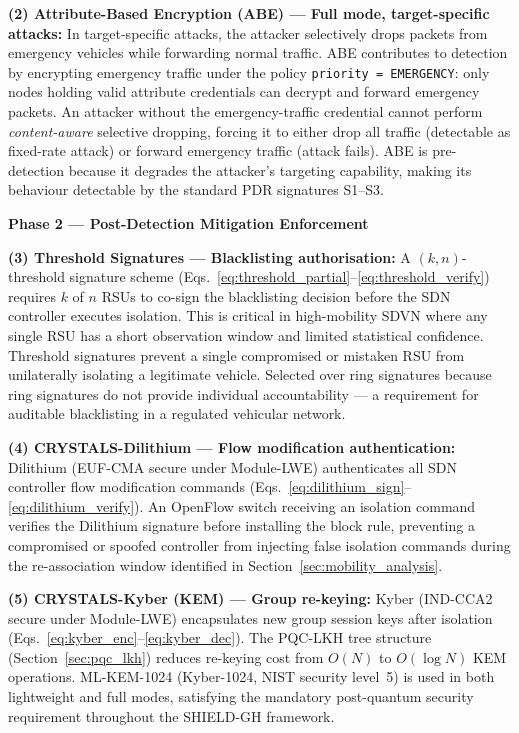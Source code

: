 \documentclass[12pt, a4paper]{report}
\newcommand{\mypar}{\vspace{0.8em}\noindent}
\begin{document}
\textbf{(2) Attribute-Based Encryption (ABE) --- Full mode, target-specific attacks:}
In target-specific attacks, the attacker selectively drops packets from emergency
vehicles while forwarding normal traffic. ABE contributes to detection by
encrypting emergency traffic under the policy \texttt{priority = EMERGENCY}: only
nodes holding valid attribute credentials can decrypt and forward emergency packets.
An attacker without the emergency-traffic credential cannot perform
\emph{content-aware} selective dropping, forcing it to either drop all traffic
(detectable as fixed-rate attack) or forward emergency traffic (attack fails).
ABE is pre-detection because it degrades the attacker's targeting capability,
making its behaviour detectable by the standard PDR signatures S1--S3.

\mypar
\textbf{Phase 2 --- Post-Detection Mitigation Enforcement}

\textbf{(3) Threshold Signatures --- Blacklisting authorisation:}
A $(k,n)$-threshold signature scheme (Eqs.~\eqref{eq:threshold_partial}--\eqref{eq:threshold_verify})
requires $k$ of $n$ RSUs to co-sign the blacklisting decision before the SDN
controller executes isolation. This is critical in high-mobility SDVN where any
single RSU has a short observation window and limited statistical confidence.
Threshold signatures prevent a single compromised or mistaken RSU from unilaterally
isolating a legitimate vehicle. Selected over ring signatures because ring
signatures do not provide individual accountability --- a requirement for auditable
blacklisting in a regulated vehicular network.

\textbf{(4) CRYSTALS-Dilithium --- Flow modification authentication:}
Dilithium (EUF-CMA secure under Module-LWE) authenticates all SDN controller flow
modification commands (Eqs.~\eqref{eq:dilithium_sign}--\eqref{eq:dilithium_verify}).
An OpenFlow switch receiving an isolation command verifies the Dilithium signature
before installing the block rule, preventing a compromised or spoofed controller
from injecting false isolation commands during the re-association window identified
in Section~\ref{sec:mobility_analysis}.

\textbf{(5) CRYSTALS-Kyber (KEM) --- Group re-keying:}
Kyber (IND-CCA2 secure under Module-LWE) encapsulates new group session keys after
isolation (Eqs.~\eqref{eq:kyber_enc}--\eqref{eq:kyber_dec}). The PQC-LKH tree
structure (Section~\ref{sec:pqc_lkh}) reduces re-keying cost from $O(N)$ to
$O(\log N)$ KEM operations. ML-KEM-1024 (Kyber-1024, NIST
security level~5) is used in both lightweight and full modes,
satisfying the mandatory post-quantum security requirement
throughout the SHIELD-GH framework.
\end{document}
